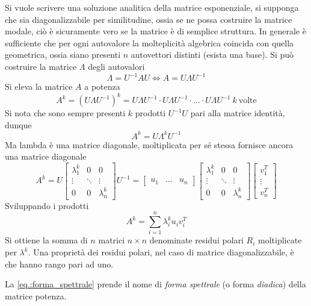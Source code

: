 Si vuole scrivere una soluzione analitica della matrice esponenziale, si
supponga che sia diagonalizzabile per similitudine, ossia se ne possa costruire
la matrice modale, ciò è sicuramente vero se la matrice è di semplice struttura.
In generale è sufficiente che per ogni autovalore la molteplicità
algebrica coincida con quella geometrica, ossia siano presenti $n$ autovettori
distinti (esista una base).
Si può costruire la matrice $\Lambda$ degli autovalori
$$
\Lambda = U^{-1}AU \Leftrightarrow A=U\Lambda U^{-1}
$$
Si eleva la matrice $A$ a potenza
$$
A^k = (U\Lambda U^{-1})^k = U\Lambda U^{-1} \cdot U\Lambda U^{-1} \cdot
\ldots\cdot U\Lambda U^{-1}\ k\ \text{volte}
$$
Si nota che sono sempre presenti $k$ prodotti $U^{-1}U$ pari alla matrice
identità, dunque
$$
A^k = U\Lambda^kU^{-1}
$$
Ma lambda è una matrice diagonale, moltiplicata per sé stessa fornisce ancora
una matrice diagonale
\begin{equation}
A^k = U \begin{bmatrix}
        \lambda_1^k & 0 & 0      \\
        \vdots & \ddots & \vdots \\
        0 & 0 & \lambda_n^k
        \end{bmatrix} U^{-1} =
\begin{bmatrix}u_1 & \ldots & u_n\end{bmatrix} \begin{bmatrix}
        \lambda_1^k & 0 & 0      \\
        \vdots & \ddots & \vdots \\
        0 & 0 & \lambda_n^k
        \end{bmatrix}
        \begin{bmatrix}
        v_1^T\\ \vdots \\ v_n^T
        \end{bmatrix}
\label{eq.:matrice_esponenziale}
\end{equation}
Sviluppando i prodotti
\begin{equation}
A^k = \sum_{i=1}^n \lambda_i^k u_i v_i^T
\label{eq.:forma_spettrale}
\end{equation}
Si ottiene la somma di $n$ matrici $n\times n$ denominate residui
polari $R_i$ moltiplicate per $\lambda^k$.
Una proprietà dei residui polari, nel caso di matrice diagonalizzabile, è che
hanno rango pari ad uno.

La \ref{eq.:forma_spettrale} prende il nome di \textit{forma spettrale} (o
forma \textit{diadica}) della matrice potenza.

